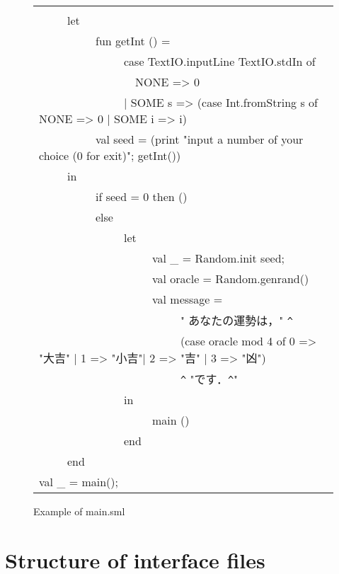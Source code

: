 \documentclass{jbook}
\newcommand{\txt}[2]{#2}
\newenvironment{program}{\begin{tt}\begin{quote}}{\end{quote}\end{tt}}
\newcommand{\myem}{\ \ \ \ \  }
\begin{document}
\begin{figure}[b]
\begin{center}
\begin{tabular}{l}
\begin{minipage}{0.9\textwidth}
\begin{program}
fun main() =\\
\myem  let\\
\myem\myem    fun getInt () = \\
\myem\myem\myem        case TextIO.inputLine TextIO.stdIn of\\
\myem\myem\myem\ \       NONE => 0\\
\myem\myem\myem        | SOME s => (case Int.fromString s of NONE => 0 | SOME i => i)\\
\myem\myem    val seed = (print "input a number of your choice (0 for exit)";  getInt())\\
\myem  in\\
\myem\myem    if seed = 0 then ()\\
\myem\myem    else\\
\myem\myem\myem      let\\
\myem\myem\myem\myem        val \_ = Random.init seed;\\
\myem\myem\myem\myem        val oracle = Random.genrand()\\
\myem\myem\myem\myem        val message = \\
\myem\myem\myem\myem\myem            " あなたの運勢は，" \verb|^|\\
\myem\myem\myem\myem\myem            (case oracle mod 4 of 0 => "大吉" | 1 => "小吉"| 2 => "吉" | 3 => "凶")\\
\myem\myem\myem\myem\myem            \verb|^| "です．\verb|^|"\\
\myem\myem\myem      in\\
\myem\myem\myem\myem        main ()\\
\myem\myem\myem      end\\
\myem  end\\
val \_ = main();
\end{program}
\end{minipage}
\end{tabular}
\caption{Example of main.sml}
\label{fig:main}
\end{center}
\end{figure}
\fi%
	
\section{\txt{インターフェイスファイルの構造}{Structure of interface files}}
\label{sec:tutorialInterfaceFile}
\end{document}
